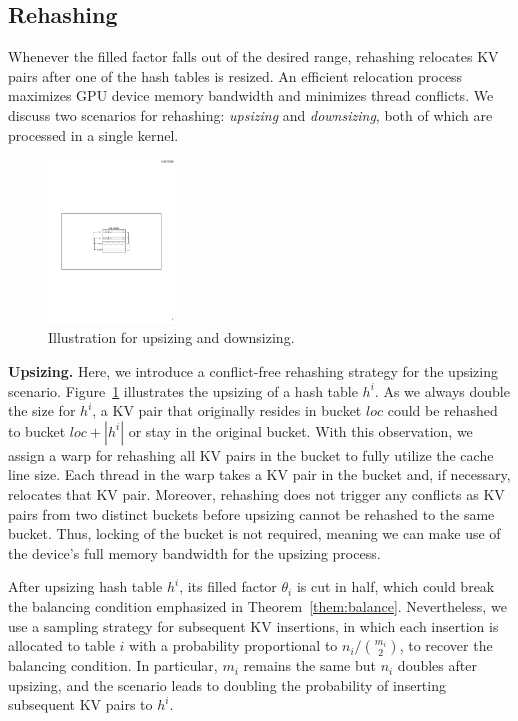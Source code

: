 \subsection{Rehashing}\label{sec:dyn:rehash}
Whenever the filled factor falls out of the desired range, rehashing relocates KV pairs after one of the hash tables is resized. An efficient relocation process maximizes GPU device memory bandwidth and minimizes thread conflicts. 
We discuss two scenarios for rehashing: \emph{upsizing} and \emph{downsizing}, both of which are processed in a single kernel. 

\begin{figure}[t]
	\centering
	\includegraphics[width=0.3\textwidth]{fig/Upsize.pdf}
	\caption{Illustration for upsizing and downsizing.}
	\label{fig:upsize}
\end{figure}
\vspace{1mm}\noindent\textbf{Upsizing.} 
Here, we introduce a conflict-free rehashing strategy for the upsizing scenario. 
Figure~\ref{fig:upsize} illustrates the upsizing of a hash table $h^i$. 
As we always double the size for $h^i$, 
a KV pair that originally resides in bucket $loc$ could be rehashed to bucket $loc+|h^i|$ or stay in the original bucket. 
With this observation, we assign a warp for rehashing all KV pairs in the bucket to fully utilize the cache line size. 
Each thread in the warp takes a KV pair in the bucket and, if necessary, relocates that KV pair.
Moreover, rehashing does not trigger any conflicts as KV pairs from two distinct buckets before upsizing cannot be rehashed to the same bucket.  
Thus, locking of the bucket is not required, meaning we can make use of the device's full memory bandwidth for the upsizing process.  

After upsizing hash table $h^i$, its filled factor $\theta_i$ is cut in half, which could break the balancing condition emphasized in Theorem~\ref{them:balance}. Nevertheless, we use a sampling strategy for subsequent KV insertions, in which each insertion is allocated to table $i$ with a probability proportional to $n_i/\binom{m_i}{2}$, to recover the balancing condition. In particular, $m_i$ remains the same but $n_i$ doubles after upsizing, and the scenario leads to doubling the probability of inserting subsequent KV pairs to $h^i$. 


